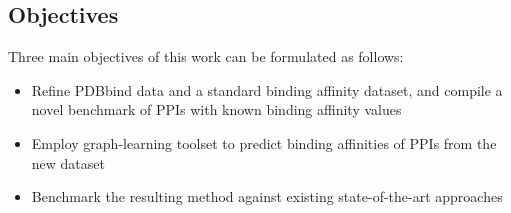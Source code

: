 \subsection{Objectives}
Three main objectives of this work can be formulated as follows:
\begin{itemize}
\item[] Refine PDBbind \cite{database} data and a standard binding affinity dataset, and compile a novel
benchmark of PPIs with known binding affinity values
\item[] Employ graph-learning toolset to predict binding affinities of PPIs from the new dataset
\item[] Benchmark the resulting method against existing state-of-the-art approaches
\end{itemize}

